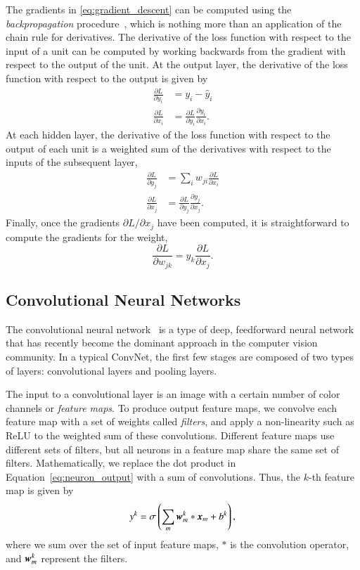 \documentclass[fleqn,usenatbib]{mnras}
\begin{document}
The gradients in \ref{eq:gradient_descent} can be computed using the
\textit{backpropagation} procedure~\citep{rumelhart1988learning},
which is nothing more than an application of the chain rule for derivatives.
The derivative of the loss function with respect to the input of a unit can be
computed by working backwards from the gradient with respect to the output of
the unit.
At the output layer, the derivative of the loss function with respect to the
output is given by
\begin{align}
  \frac{ \partial L }{ \partial y_i } &= y_i - \hat{y}_i \\
  \frac{ \partial L }{ \partial x_i } &=
    \frac{ \partial L }{ \partial y_i }
    \frac{ \partial y_i }{ \partial x_i }.
\end{align}
At each hidden layer, the derivative of the loss function with respect to the
output of each unit is a weighted sum of the derivatives with respect to the
inputs of the subsequent layer,
\begin{align}
  \frac{ \partial L }{ \partial y_j } &=
    \sum_{i} w_{ji} \frac{ \partial L }{ \partial x_i}   \\
  \frac{ \partial L }{ \partial x_j } &=
    \frac{ \partial L }{ \partial y_j }
    \frac{ \partial y_j }{ \partial x_j }.
\end{align}
Finally, once the gradients $\partial L / \partial x_j$ have been
computed, it is straightforward to compute the gradients for the weight,
\begin{equation}
\frac{\partial L}{\partial w_{jk}} = y_k \frac{\partial L}{\partial x_j}.
\end{equation}

\subsection{Convolutional Neural Networks}
  \label{sec:convnet}

The convolutional neural network~\citep[ConvNet;][]{fukushima1980neocognitron,lecun1998gradient}
is a type of deep, feedforward neural network
that has recently become the dominant approach in the computer vision community.
In a typical ConvNet, the first few stages are composed of two types of layers: 
convolutional layers and pooling layers.

The input to a convolutional layer is an image with a certain number of color channels
or \textit{feature maps}.
To produce output feature maps, we convolve each feature map with a set of weights
called \textit{filters},
and apply a non-linearity such as ReLU to the weighted sum of these convolutions.
Different feature maps use different sets of filters,
but all neurons in a feature map share the same set of filters.
Mathematically, we replace the dot product in Equation~\ref{eq:neuron_output}
with a sum of convolutions. Thus, the $k$-th feature map is given by
\begin{equation}
  y^k = \sigma \left( \sum_{m} \bmath{w}_m^k \ast \bmath{x}_m + b^k \right),
\end{equation}
where we sum over the set of input feature maps,
$\ast$ is the convolution operator, and $\bmath{w}_m^k$ represent the filters.
\end{document}
